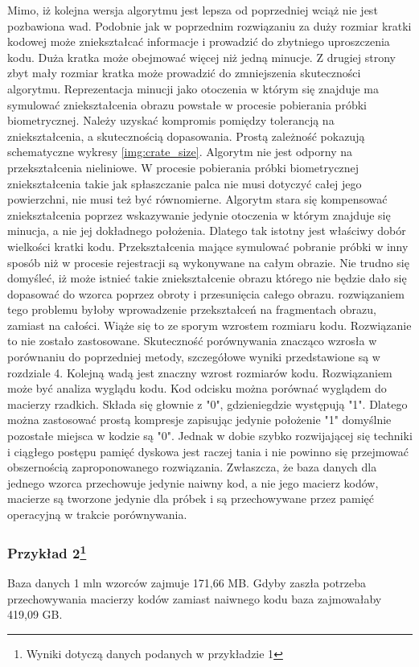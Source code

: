Mimo, iż kolejna wersja algorytmu jest lepsza od poprzedniej wciąż nie jest pozbawiona wad. Podobnie jak w poprzednim rozwiązaniu za duży rozmiar kratki kodowej może zniekształcać informacje i prowadzić do 
zbytniego uproszczenia kodu. Duża kratka może obejmować więcej niż jedną minucje. Z drugiej strony zbyt mały rozmiar kratka może prowadzić do zmniejszenia skuteczności algorytmu. Reprezentacja minucji jako 
otoczenia w którym się znajduje ma symulować zniekształcenia obrazu powstałe w procesie pobierania próbki biometrycznej. Należy uzyskać kompromis pomiędzy tolerancją na zniekształcenia, a skutecznością 
dopasowania. Prostą zależność pokazują schematyczne wykresy \ref{img:crate_size}. Algorytm nie jest odporny na przekształcenia nieliniowe. W procesie pobierania próbki biometrycznej zniekształcenia takie 
jak spłaszczanie palca nie musi dotyczyć całej jego powierzchni, nie musi też być równomierne. Algorytm stara się kompensować zniekształcenia poprzez wskazywanie jedynie otoczenia w którym znajduje się 
minucja, a nie jej dokładnego położenia. Dlatego tak istotny jest właściwy dobór wielkości kratki kodu. Przekształcenia mające symulować pobranie próbki w inny sposób niż w procesie rejestracji są 
wykonywane na całym obrazie. Nie trudno się domyśleć, iż może istnieć takie zniekształcenie obrazu którego nie będzie dało się dopasować do wzorca poprzez obroty i przesunięcia całego obrazu. rozwiązaniem 
tego problemu byłoby wprowadzenie przekształceń na fragmentach obrazu, zamiast na całości. Wiąże się to ze sporym wzrostem rozmiaru kodu. Rozwiązanie to nie zostało zastosowane. Skuteczność porównywania 
znacząco wzrosła w porównaniu do poprzedniej metody, szczegółowe wyniki przedstawione są w rozdziale 4. Kolejną wadą jest znaczny wzrost rozmiarów kodu. Rozwiązaniem może być analiza wyglądu kodu. Kod 
odcisku można porównać wyglądem do macierzy rzadkich. Składa się głownie z "0", gdzieniegdzie występują "1". Dlatego można zastosować prostą kompresje zapisując jedynie położenie "1" domyślnie pozostałe 
miejsca w kodzie są "0". Jednak w dobie szybko rozwijającej się techniki i ciągłego postępu pamięć dyskowa jest raczej tania i nie powinno się przejmować obszernością zaproponowanego rozwiązania. 
Zwłaszcza, że baza danych dla jednego wzorca przechowuje jedynie naiwny kod, a nie jego macierz kodów, macierze są tworzone jedynie dla próbek i są przechowywane przez pamięć operacyjną w trakcie 
porównywania. 
\subsubsection{Przykład 2\footnote{Wyniki dotyczą danych podanych w przykładzie 1}}
Baza danych 1 mln wzorców zajmuje 171,66 MB. Gdyby zaszła potrzeba przechowywania macierzy kodów zamiast naiwnego kodu baza zajmowałaby 419,09 GB. 
